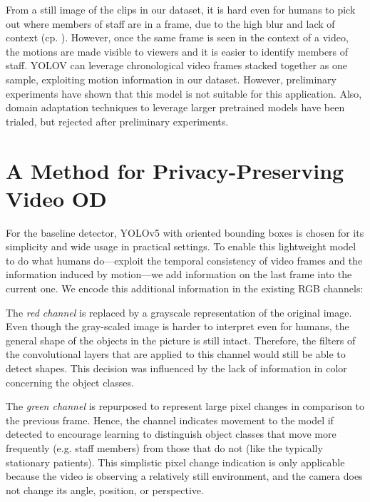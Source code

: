 \documentclass[conference]{IEEEtran}
\begin{document}
From a still image of the clips in our dataset, it is hard even for humans to pick out where members of staff are in a frame, due to the high blur and lack of context (cp. ).
However, once the same frame is seen in the context of a video, the motions are made visible to viewers and it is easier to identify members of staff.
YOLOV \cite{Ge2021} can leverage chronological video frames stacked together as one sample, exploiting motion information in our dataset.
However, preliminary experiments have shown that this model is not suitable for this application.
Also, domain adaptation techniques to leverage larger pretrained models \cite{sager2022unsupervised} have been trialed, but rejected after preliminary experiments.



\section{A Method for Privacy-Preserving Video OD}
\label{sec:Method}
For the baseline detector, YOLOv5 with oriented bounding boxes\cite{hukaixuan199706272021} is chosen for its simplicity and wide usage in practical settings.
To enable this lightweight model to do what humans do---exploit the temporal consistency of video frames and the information induced by motion---we add information on the last frame into the current one.
We encode this additional information in the existing RGB channels:

The \emph{red channel} is replaced by a grayscale representation of the original image.
Even though the gray-scaled image is harder to interpret even for humans, the general shape of the objects in the picture is still intact.
Therefore, the filters of the convolutional layers that are applied to this channel would still be able to detect shapes.
This decision was influenced by the lack of information in color concerning the object classes.

The \emph{green channel} is repurposed to represent large pixel changes in comparison to the previous frame.
Hence, the channel indicates movement to the model if detected to encourage learning to distinguish object classes that move more frequently (e.g. staff members) from those that do not (like the typically stationary patients).
This simplistic pixel change indication is only applicable because the video is observing a relatively still environment, and the camera does not change its angle, position, or perspective.
\end{document}
